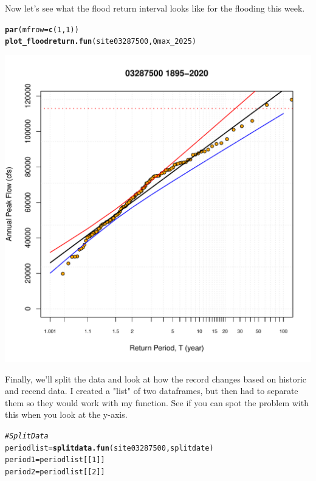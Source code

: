 \documentclass{tufte-handout}\usepackage[]{graphicx}\usepackage[]{xcolor}
\makeatletter
\def\maxwidth{ %
  \ifdim\Gin@nat@width>\linewidth
    \linewidth
  \else
    \Gin@nat@width
  \fi
}
\newcommand{\hlnum}[1]{\textcolor[rgb]{0.686,0.059,0.569}{#1}}%
\newcommand{\hlcom}[1]{\textcolor[rgb]{0.678,0.584,0.686}{\textit{#1}}}%
\newcommand{\hlstd}[1]{\textcolor[rgb]{0.345,0.345,0.345}{#1}}%
\newcommand{\hlkwb}[1]{\textcolor[rgb]{0.69,0.353,0.396}{#1}}%
\newcommand{\hlkwc}[1]{\textcolor[rgb]{0.333,0.667,0.333}{#1}}%
\newcommand{\hlkwd}[1]{\textcolor[rgb]{0.737,0.353,0.396}{\textbf{#1}}}%
\newenvironment{kframe}{%
 \def\at@end@of@kframe{}%
 \ifinner\ifhmode%
  \def\at@end@of@kframe{\end{minipage}}%
  \begin{minipage}{\columnwidth}%
 \fi\fi%
 \def\FrameCommand##1{\hskip\@totalleftmargin \hskip-\fboxsep
 \colorbox{shadecolor}{##1}\hskip-\fboxsep
     \hskip-\linewidth \hskip-\@totalleftmargin \hskip\columnwidth}%
 \MakeFramed {\advance\hsize-\width
   \@totalleftmargin\z@ \linewidth\hsize
   \@setminipage}}%
 {\par\unskip\endMakeFramed%
 \at@end@of@kframe}
\newenvironment{knitrout}{}{} %
\makeatother
\begin{document}
Now let's see what the flood return interval looks like for the flooding this week. 

\begin{knitrout}
\color{fgcolor}\begin{kframe}
\begin{alltt}
\hlkwd{par}\hlstd{(}\hlkwc{mfrow}\hlstd{=}\hlkwd{c}\hlstd{(}\hlnum{1}\hlstd{,}\hlnum{1}\hlstd{))}
\hlkwd{plot_floodreturn.fun}\hlstd{(site03287500, Qmax_2025)}
\end{alltt}
\end{kframe}
\includegraphics[width=\maxwidth]{figure/unnamed-chunk-17-1} 
\end{knitrout}

Finally, we'll split the data and look at how the record changes based on historic and recend data. I created a "list" of two dataframes, but then had to separate them so they would work with my function. See if you can spot the problem with this when you look at the y-axis.

\begin{knitrout}
\color{fgcolor}\begin{kframe}
\begin{alltt}
\hlcom{# Split Data}
\hlstd{periodlist} \hlkwb{=} \hlkwd{splitdata.fun}\hlstd{(site03287500, splitdate)}
\hlstd{period1} \hlkwb{=} \hlstd{periodlist[[}\hlnum{1}\hlstd{]]}
\hlstd{period2} \hlkwb{=} \hlstd{periodlist[[}\hlnum{2}\hlstd{]]}
\end{alltt}
\end{kframe}
\end{knitrout}
\end{document}
